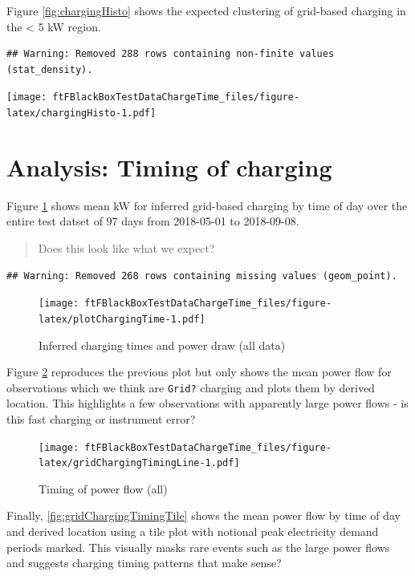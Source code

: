 \documentclass[]{article}
\begin{document}
Figure \ref{fig:chargingHisto} shows the expected clustering of
grid-based charging in the \textless{} 5 kW region.

\begin{verbatim}
## Warning: Removed 288 rows containing non-finite values (stat_density).
\end{verbatim}

\texttt{[image: ftFBlackBoxTestDataChargeTime\_files/figure-latex/chargingHisto-1.pdf]}

\section{Analysis: Timing of
charging}\label{analysis-timing-of-charging}

Figure \ref{fig:plotChargingTime} shows mean kW for inferred grid-based
charging by time of day over the entire test datset of 97 days from
2018-05-01 to 2018-09-08.

\begin{quote}
Does this look like what we expect?
\end{quote}

\begin{verbatim}
## Warning: Removed 268 rows containing missing values (geom_point).
\end{verbatim}

\begin{figure}
\centering
\texttt{[image: ftFBlackBoxTestDataChargeTime\_files/figure-latex/plotChargingTime-1.pdf]}
\caption{\label{fig:plotChargingTime}Inferred charging times and power draw
(all data)}
\end{figure}

Figure \ref{fig:gridChargingTimingLine} reproduces the previous plot but
only shows the mean power flow for observations which we think are
\texttt{Grid?} charging and plots them by derived location. This
highlights a few observations with apparently large power flows - is
this fast charging or instrument error?

\begin{figure}
\centering
\texttt{[image: ftFBlackBoxTestDataChargeTime\_files/figure-latex/gridChargingTimingLine-1.pdf]}
\caption{\label{fig:gridChargingTimingLine}Timing of power flow (all)}
\end{figure}

Finally, \ref{fig:gridChargingTimingTile} shows the mean power flow by
time of day and derived location using a tile plot with notional peak
electricity demand periods marked. This visually masks rare events such
as the large power flows and suggests charging timing patterns that make
sense?
\end{document}
